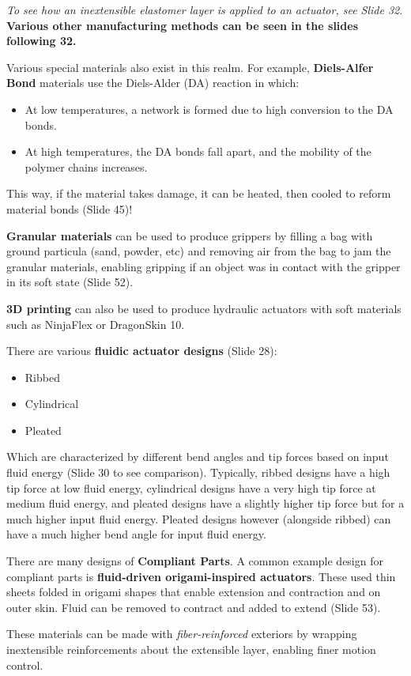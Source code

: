 \documentclass[onecolumn,a4paper]{article}
\begin{document}
 \emph{To see how an inextensible elastomer layer is applied to an actuator, see Slide 32}. \textbf{Various other manufacturing methods can be seen in the slides following 32.}

 Various special materials also exist in this realm. For example, \textbf{Diels-Alfer Bond} materials use the Diels-Alder (DA) reaction in which:
 \begin{itemize}
     \item At low temperatures, a network is formed due to high conversion to the DA bonds.
    \item At high temperatures, the DA bonds fall apart, and the mobility of the polymer chains increases.
 \end{itemize}
 This way, if the material takes damage, it can be heated, then cooled to reform material bonds (Slide 45)!

 \textbf{Granular materials} can be used to produce grippers by filling a bag with ground particula (sand, powder, etc) and removing air from the bag to jam the granular materials, enabling gripping if an object was in contact with the gripper in its soft state (Slide 52).

 \textbf{3D printing} can also be used to produce hydraulic actuators with soft materials such as NinjaFlex or DragonSkin 10.

There are various \textbf{fluidic actuator designs} (Slide 28):
\begin{itemize}
    \item Ribbed
    \item Cylindrical
    \item Pleated
\end{itemize}
Which are characterized by different bend angles and tip forces based on input fluid energy (Slide 30 to see comparison). Typically, ribbed designs have a high tip force at low fluid energy, cylindrical designs have a very high tip force at medium fluid energy, and pleated designs have a slightly higher tip force but for a much higher input fluid energy. Pleated designs however (alongside ribbed) can have a much higher bend angle for input fluid energy.

There are many designs of \textbf{Compliant Parts}. A common example design for compliant parts is \textbf{fluid-driven origami-inspired actuators}. These used thin sheets  folded in origami shapes that enable extension and contraction and on outer skin. Fluid can be removed to contract and added to extend (Slide 53).

These materials can be made with \emph{fiber-reinforced} exteriors by wrapping inextensible reinforcements about the extensible layer, enabling finer motion control.
\end{document}
